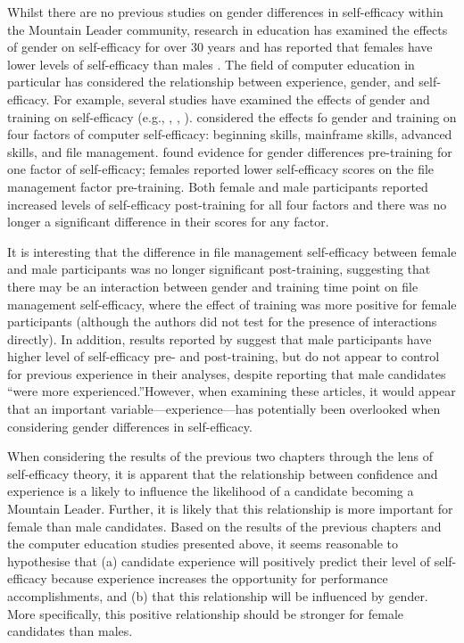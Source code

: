 \documentclass[
  12pt,
  a4paper,
]{book}
\begin{document}
Whilst there are no previous studies on gender differences in self-efficacy within the Mountain Leader community, research in education has examined the effects of gender on self-efficacy for over 30 years and has reported that females have lower levels of self-efficacy than males \citep[e.g.,][]{Murphy1989, Klassen2010}. The field of computer education in particular has considered the relationship between experience, gender, and self-efficacy. For example, several studies have examined the effects of gender and training on self-efficacy (e.g., \citet{Cassidy2002}, \citet{Murphy1989}, \citet{Torkzadeh1994}). \citet{Torkzadeh1994} considered the effects fo gender and training on four factors of computer self-efficacy: beginning skills, mainframe skills, advanced skills, and file management. \citet{Torkzadeh1994} found evidence for gender differences pre-training for one factor of self-efficacy; females reported lower self-efficacy scores on the file management factor pre-training. Both female and male participants reported increased levels of self-efficacy post-training for all four factors and there was no longer a significant difference in their scores for any factor.

It is interesting that the difference in file management self-efficacy between female and male participants was no longer significant post-training, suggesting that there may be an interaction between gender and training time point on file management self-efficacy, where the effect of training was more positive for female participants (although the authors did not test for the presence of interactions directly). In addition, results reported by \citet{Cassidy2002} suggest that male participants have higher level of self-efficacy pre- and post-training, but do not appear to control for previous experience in their analyses, despite reporting that male candidates ``were more experienced.''However, when examining these articles, it would appear that an important variable---experience---has potentially been overlooked when considering gender differences in self-efficacy.

When considering the results of the previous two chapters through the lens of self-efficacy theory, it is apparent that the relationship between confidence and experience is a likely to influence the likelihood of a candidate becoming a Mountain Leader. Further, it is likely that this relationship is more important for female than male candidates. Based on the results of the previous chapters and the computer education studies presented above, it seems reasonable to hypothesise that (a) candidate experience will positively predict their level of self-efficacy because experience increases the opportunity for performance accomplishments, and (b) that this relationship will be influenced by gender. More specifically, this positive relationship should be stronger for female candidates than males.
\end{document}
